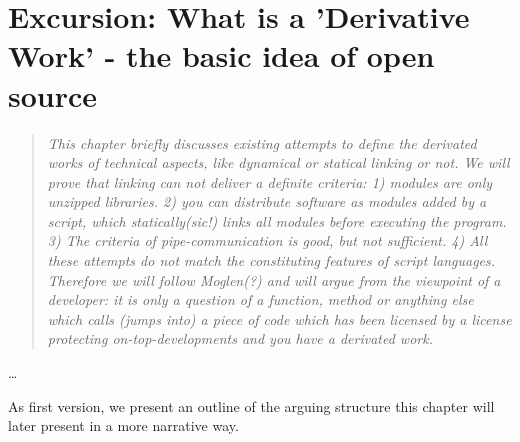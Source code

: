 %
%
%
%
%



\section{Excursion: What is a 'Derivative Work' - the basic idea of open source}
\footnotesize
\begin{quote}\itshape
This chapter briefly discusses existing attempts to define the derivated works of
technical aspects, like dynamical or statical linking or not. We will
prove that linking can not deliver a definite criteria: 1) modules are only
unzipped libraries. 2) you can distribute software as modules added by a script,
which statically(sic!) links all modules before executing the program. 3) The
criteria of pipe-communication is good, but not sufficient. 4) All these
attempts do not match the constituting features of script languages. Therefore we
will follow Moglen(?) and will argue from the viewpoint of a developer: it is
only a question of a function, method or anything else which calls (jumps into)
a piece of code which has been licensed by a license protecting
on-top-developments and you have a derivated work.
\end{quote}
\normalsize
\ldots

As first version, we present an outline of the arguing structure this chapter will
later present in a more narrative way.


